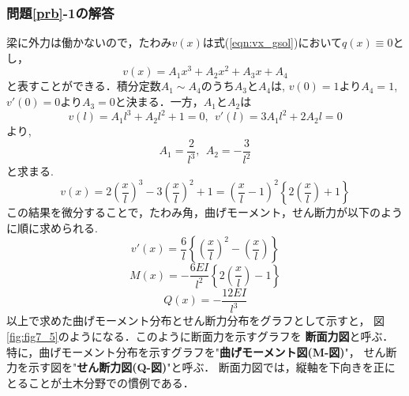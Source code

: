 \documentclass[10pt,a4j]{jbook}
\begin{document}
\subsubsection*{問題\ref{prb}-1の解答}
梁に外力は働かないので，たわみ$v(x)$は式(\ref{eqn:vx_gsol})において$q(x)\equiv 0$とし，
\begin{equation}
	v(x)=A_1 x^3 +A_2x^2 + A_3x + A_4
\end{equation}
と表すことができる．積分定数$A_1\sim A_4$のうち$A_3$と$A_4$は, $v(0)=1$より$A_4=1$,
$v'(0)=0$より$A_3=0$と決まる．一方，$A_1$と$A_2$は
\[
	v(l)=A_1l^3+A_2l^2+1=0, \ \ 
	v'(l)=3A_1l^2+2A_2l=0
\]
より, 
\[
	A_1=\frac{2}{l^3}, \ \ A_2=-\frac{3}{l^2}
\]
と求まる.
\[
	v(x)=
	2\left(\frac{x}{l}\right)^3
	-
	3\left(\frac{x}{l}\right)^2
	+
	1
	=\left(\frac{x}{l}-1\right)^2\left\{ 2\left(\frac{x}{l}\right)+1\right\}
\]
この結果を微分することで，たわみ角，曲げモーメント，せん断力が以下のように順に求められる.
\[
	v'(x)=\frac{6}{l}\left\{ \left(\frac{x}{l}\right)^2-\left(\frac{x}{l} \right) \right\}
\]
\[
	M(x)=-\frac{6EI}{l^2}\left\{ 2\left(\frac{x}{l}\right)-1 \right\}
\]
\[
	Q(x)=-\frac{12EI}{l^3}
\]
以上で求めた曲げモーメント分布とせん断力分布をグラフとして示すと，
図\ref{fig:fig7_5}のようになる．このように断面力を示すグラフを
{\bf 断面力図}と呼ぶ．特に，曲げモーメント分布を示すグラフを"{\bf 曲げモーメント図(M-図)}"，
せん断力を示す図を"{\bf せん断力図(Q-図)}"と呼ぶ．
断面力図では，縦軸を下向きを正にとることが土木分野での慣例である．
\end{document}
